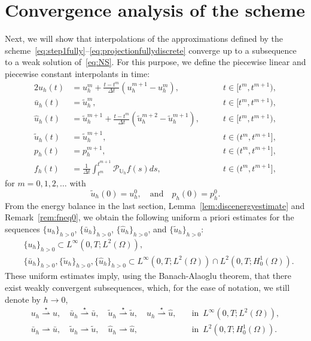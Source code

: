 \documentclass[10pt,letterpaper]{amsart}
\newcommand{\tu}{\widetilde{u}}
\newcommand{\hu}{\widehat{u}}
\newcommand{\dom}{\Omega}
\newcommand{\Uh}{\mathbb{U}_h}
\newcommand{\weak}{\rightharpoonup}
\newcommand{\weakstar}{\overset{\star}\rightharpoonup}
\newcommand{\PUh}{\mathcal{P}_{\Uh}}
\theoremstyle{definition}{\newtheorem{definition}[lemma]{Definition}}
\numberwithin{equation}{section}
\begin{document}
\section{Convergence analysis of the scheme}\label{sec:convergence}
Next, we will show that interpolations of the approximations defined by the scheme~\eqref{eq:step1fully}--\eqref{eq:projectionfullydiscrete} converge up to a subsequence to a weak solution of~\eqref{eq:NS}. For this purpose, we define the piecewise linear and piecewise constant interpolants in time:
\begin{alignat}{2}
	u_h(t)& = u_h^m+\frac{t-t^m}{\Delta t}(u^{m+1}_h-u^m_h),\qquad &t\in [t^m,t^{m+1}),\label{eq:defuh}\\
	\bar{u}_h(t) &= \tu_h^m,\qquad &t\in [t^m,t^{m+1}),\\
		\hu_h(t)& = \tu_h^{m+1}+\frac{t-t^m}{\Delta t}(\tu^{m+2}_h-\tu^{m+1}_h),\qquad &t\in [t^m,t^{m+1}),\\
	\widetilde{u}_h(t) &= \widetilde{u}_h^{m+1},\qquad &t\in (t^m,t^{m+1}],\\
	p_h(t)& = p_h^{m+1},\qquad & t\in (t^m,t^{m+1}],\\
	f_h(t)& = \frac{1}{\Delta t}\int_{t^m}^{t^{m+1}}\PUh f(s)ds,\qquad &t\in (t^m,t^{m+1}],\label{eq:defph}
\end{alignat}
for $m=0,1,2,\dots$ with
\begin{equation*}
	\tu_h(0)=u^0_h,\quad \text{and}\quad p_h(0)=p_h^0.
\end{equation*}
From the energy balance in the last section, Lemma~\ref{lem:discenergyestimate} and Remark~\ref{rem:fneq0}, we obtain the following uniform a priori estimates for the sequences $\{u_h\}_{h>0}$, $\{\bar{u}_h\}_{h>0}$, $\{\hu_h\}_{h>0}$, and $\{\tu_h\}_{h>0}$:
\begin{align*}
	&\{u_h\}_{h>0}\subset L^\infty(0,T;L^2(\dom)),\\
	&\{\bar{u}_h\}_{h>0},\{\widetilde{u}_h\}_{h>0}, \{\widehat{u}_h\}_{h>0}\subset L^\infty(0,T;L^2(\dom))\cap L^2(0,T;H^1_0(\dom)).
\end{align*}
These uniform estimates imply, using the Banach-Alaoglu theorem, that there exist weakly convergent subsequences, which, for the ease of notation, we still denote by $h\to 0$,
\begin{align}
	u_h\weakstar u,\quad 	\bar{u}_h\weakstar \bar{u},\quad \widetilde{u}_h\weakstar \widetilde{u},\quad \widehat{u}_h\weakstar \widehat{u},&\quad \text{in }\, L^\infty(0,T;L^2(\dom)),\label{eq:uhweakconv}\\
\bar{u}_h\weak \bar{u},\quad	\widetilde{u}_h\weak \widetilde{u},\quad 	\widehat{u}_h\weak \widehat{u},&\quad \text{in }\, L^2(0,T;H^1_0(\dom)).\label{eq:Hhweakconv}
\end{align}
\end{document}
